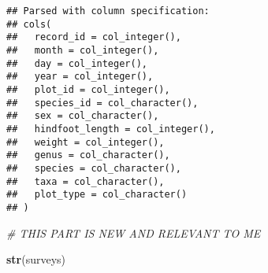 \documentclass[]{article}
\newenvironment{Shaded}{\begin{snugshade}}{\end{snugshade}}
\newcommand{\KeywordTok}[1]{\textcolor[rgb]{0.13,0.29,0.53}{\textbf{#1}}}
\newcommand{\CommentTok}[1]{\textcolor[rgb]{0.56,0.35,0.01}{\textit{#1}}}
\newcommand{\NormalTok}[1]{#1}
\begin{document}
\begin{verbatim}
## Parsed with column specification:
## cols(
##   record_id = col_integer(),
##   month = col_integer(),
##   day = col_integer(),
##   year = col_integer(),
##   plot_id = col_integer(),
##   species_id = col_character(),
##   sex = col_character(),
##   hindfoot_length = col_integer(),
##   weight = col_integer(),
##   genus = col_character(),
##   species = col_character(),
##   taxa = col_character(),
##   plot_type = col_character()
## )
\end{verbatim}

\begin{Shaded}
\begin{Highlighting}[]
\CommentTok{# THIS PART IS NEW AND RELEVANT TO ME }

\KeywordTok{str}\NormalTok{(surveys)}
\end{Highlighting}
\end{Shaded}
\end{document}
